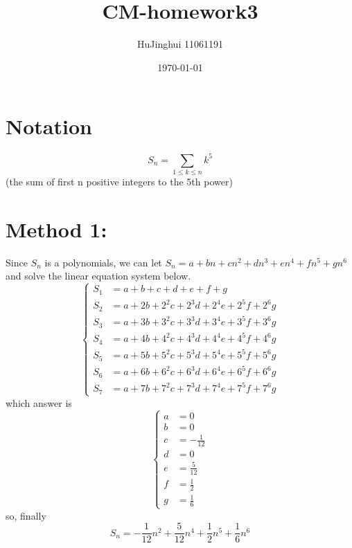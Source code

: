 \documentclass{article}
\begin{document}
\title{CM-homework3}
\author{HuJinghui 11061191}
\date{\today}
\maketitle
\section{Notation}
$$S_n = \sum_{1 \leq k \leq n} k^5$$
(the sum of first n positive integers to the 5th power)
\section{Method 1:}
Since $S_n$ is a polynomials, we can let 
$S_n = a + bn + cn^2 + dn^3 + en^4 + fn^5 + gn^6$
and solve the linear equation system below.
\begin{equation}
\left\{
\begin{aligned}
S_1 &= a + b + c + d + e + f + g\\
S_2 &= a + 2b + 2^2c + 2^3d + 2^4e + 2^5f + 2^6g\\
S_3 &= a + 3b + 3^2c + 3^3d + 3^4e + 3^5f + 3^6g\\
S_4 &= a + 4b + 4^2c + 4^3d + 4^4e + 4^5f + 4^6g\\
S_5 &= a + 5b + 5^2c + 5^3d + 5^4e + 5^5f + 5^6g\\
S_6 &= a + 6b + 6^2c + 6^3d + 6^4e + 6^5f + 6^6g\\
S_7 &= a + 7b + 7^2c + 7^3d + 7^4e + 7^5f + 7^6g
\end{aligned}
\right.
\end{equation}
which answer is
\begin{equation}
\left\{
\begin{aligned}
a &= 0\\
b &= 0\\
c &= -\frac{1}{12}\\
d &= 0\\
e &= \frac{5}{12}\\
f &= \frac{1}{2}\\
g &= \frac{1}{6}
\end{aligned}
\right.
\end{equation}
so, finally 
\begin{equation}
S_n=-\frac{1}{12}n^2+\frac{5}{12}n^4
+\frac{1}{2}n^5+\frac{1}{6}n^6
\end{equation}
\end{document}
